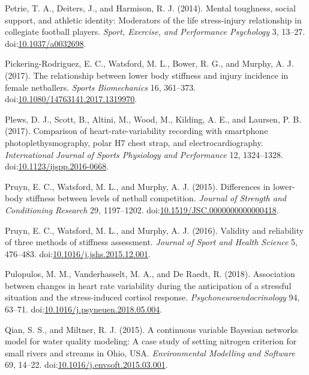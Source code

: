 \documentclass[
]{frontiersHLTH}
\newlength{\cslhangindent}
\newenvironment{cslreferences}%
  {\setlength{\parindent}{0pt}%
  \everypar{\setlength{\hangindent}{\cslhangindent}}\ignorespaces}%
  {\par}
\begin{document}
\begin{cslreferences}
\leavevmode\hypertarget{ref-Petrie2014}{}%
Petrie, T. A., Deiters, J., and Harmison, R. J. (2014). Mental
toughness, social support, and athletic identity: Moderators of the life
stress-injury relationship in collegiate football players. \emph{Sport,
Exercise, and Performance Psychology} 3, 13--27.
doi:\href{https://doi.org/10.1037/a0032698}{10.1037/a0032698}.

\leavevmode\hypertarget{ref-PickeringRodriguez2017}{}%
Pickering-Rodriguez, E. C., Watsford, M. L., Bower, R. G., and Murphy,
A. J. (2017). The relationship between lower body stiffness and injury
incidence in female netballers. \emph{Sports Biomechanics} 16, 361--373.
doi:\href{https://doi.org/10.1080/14763141.2017.1319970}{10.1080/14763141.2017.1319970}.

\leavevmode\hypertarget{ref-Plews2017}{}%
Plews, D. J., Scott, B., Altini, M., Wood, M., Kilding, A. E., and
Laursen, P. B. (2017). Comparison of heart-rate-variability recording
with smartphone photoplethysmography, polar H7 chest strap, and
electrocardiography. \emph{International Journal of Sports Physiology
and Performance} 12, 1324--1328.
doi:\href{https://doi.org/10.1123/ijspp.2016-0668}{10.1123/ijspp.2016-0668}.

\leavevmode\hypertarget{ref-Pruyn2015}{}%
Pruyn, E. C., Watsford, M. L., and Murphy, A. J. (2015). Differences in
lower-body stiffness between levels of netball competition.
\emph{Journal of Strength and Conditioning Research} 29, 1197--1202.
doi:\href{https://doi.org/10.1519/JSC.0000000000000418}{10.1519/JSC.0000000000000418}.

\leavevmode\hypertarget{ref-Pruyn2016}{}%
Pruyn, E. C., Watsford, M. L., and Murphy, A. J. (2016). Validity and
reliability of three methods of stiffness assessment. \emph{Journal of
Sport and Health Science} 5, 476--483.
doi:\href{https://doi.org/10.1016/j.jshs.2015.12.001}{10.1016/j.jshs.2015.12.001}.

\leavevmode\hypertarget{ref-Pulopulos2018}{}%
Pulopulos, M. M., Vanderhasselt, M. A., and De Raedt, R. (2018).
Association between changes in heart rate variability during the
anticipation of a stressful situation and the stress-induced cortisol
response. \emph{Psychoneuroendocrinology} 94, 63--71.
doi:\href{https://doi.org/10.1016/j.psyneuen.2018.05.004}{10.1016/j.psyneuen.2018.05.004}.

\leavevmode\hypertarget{ref-Qian2015}{}%
Qian, S. S., and Miltner, R. J. (2015). A continuous variable Bayesian
networks model for water quality modeling: A case study of setting
nitrogen criterion for small rivers and streams in Ohio, USA.
\emph{Environmental Modelling and Software} 69, 14--22.
doi:\href{https://doi.org/10.1016/j.envsoft.2015.03.001}{10.1016/j.envsoft.2015.03.001}.


\end{cslreferences}
\end{document}

